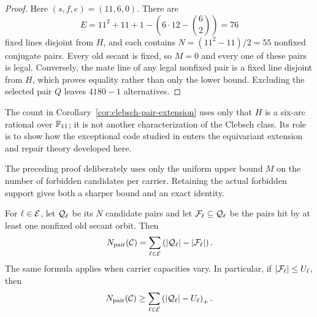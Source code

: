 \begin{proof}
Here $(s,f,e)=(11,6,0)$.  There are
\[
 E=11^2+11+1-\left(6\cdot12-\binom62\right)=76
\]
fixed lines disjoint from $H$, and each contains
$N=(11^2-11)/2=55$ nonfixed conjugate pairs.  Every old secant is fixed, so
$M=0$ and every one of these pairs is legal.  Conversely, the mate line of
any legal nonfixed pair is a fixed line disjoint from $H$, which proves
equality rather than only the lower bound.  Excluding the selected pair
$Q$ leaves $4180-1$ alternatives.
\end{proof}

\begin{remark}
The count in Corollary~\ref{cor:clebsch-pair-extension} uses only that $H$
is a six-arc rational over $\mathbb{F}_{11}$; it is not another characterization of
the Clebsch class.  Its role is to show how the exceptional code studied in
\cite{RuddClebschRigidity2026} enters the equivariant extension and repair
theory developed here.
\end{remark}

The preceding proof deliberately uses only the uniform upper bound $M$ on
the number of forbidden candidates per carrier.  Retaining the actual
forbidden support gives both a sharper bound and an exact identity.

For $\ell\in\mathcal{E}$, let $\mathcal{Q}_\ell$ be its $N$ candidate pairs and let
$\mathcal{F}_\ell\subseteq\mathcal{Q}_\ell$ be the pairs hit by at least one nonfixed old
secant orbit.  Then
\begin{equation}\label{eq:heterogeneous}
  N_{\mathrm{pair}}(\mathcal{C})=\sum_{\ell\in\mathcal{E}}
  \left(|\mathcal{Q}_\ell|-|\mathcal{F}_\ell|\right).
\end{equation}
The same formula applies when carrier capacities vary.  In particular, if
$|\mathcal{F}_\ell|\le U_\ell$, then
\[
  N_{\mathrm{pair}}(\mathcal{C})\ge
  \sum_{\ell\in\mathcal{E}}\left(|\mathcal{Q}_\ell|-U_\ell\right)_{+}.
\]
